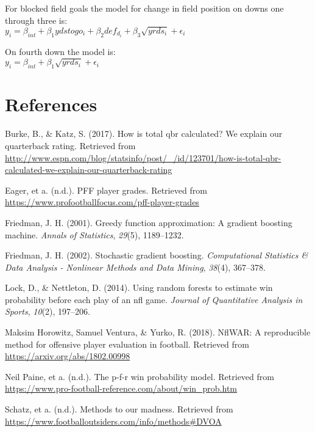 \documentclass[12pt,twoside]{dukestatscithesis}
\begin{document}
For blocked field goals the model for change in field position on downs one through three is:\\
\(y_{i} = \beta_{int} + \beta_{1}ydstogo_i + \beta_{2}def_{d_i} + \beta_{3}\sqrt{yrds_i} + \epsilon_{i}\)

On fourth down the model is:\\
\(y_{i} = \beta_{int} + \beta_{1}\sqrt{yrds_i} + \epsilon_{i}\)

\backmatter

\hypertarget{references}{%
\chapter*{References}\label{references}}


\noindent

\setlength{\parindent}{-0.20in}
\setlength{\leftskip}{0.20in}
\setlength{\parskip}{8pt}

\hypertarget{refs}{}
\leavevmode\hypertarget{ref-ESPN}{}%
Burke, B., \& Katz, S. (2017). How is total qbr calculated? We explain our quarterback rating. Retrieved from \url{http://www.espn.com/blog/statsinfo/post/_/id/123701/how-is-total-qbr-calculated-we-explain-our-quarterback-rating}

\leavevmode\hypertarget{ref-PFF}{}%
Eager, et a. (n.d.). PFF player grades. Retrieved from \url{https://www.profootballfocus.com/pff-player-grades}

\leavevmode\hypertarget{ref-friedman2001}{}%
Friedman, J. H. (2001). Greedy function approximation: A gradient boosting machine. \emph{Annals of Statistics}, \emph{29}(5), 1189--1232.

\leavevmode\hypertarget{ref-friedman2002}{}%
Friedman, J. H. (2002). Stochastic gradient boosting. \emph{Computational Statistics \& Data Analysis - Nonlinear Methods and Data Mining}, \emph{38}(4), 367--378.

\leavevmode\hypertarget{ref-lock2014}{}%
Lock, D., \& Nettleton, D. (2014). Using random forests to estimate win probability before each play of an nfl game. \emph{Journal of Quantitative Analysis in Sports}, \emph{10}(2), 197--206.

\leavevmode\hypertarget{ref-nflWAR}{}%
Maksim Horowitz, Samuel Ventura, \& Yurko, R. (2018). NflWAR: A reproducible method for offensive player evaluation in football. Retrieved from \url{https://arxiv.org/abs/1802.00998}

\leavevmode\hypertarget{ref-PFR}{}%
Neil Paine, et a. (n.d.). The p-f-r win probability model. Retrieved from \url{https://www.pro-football-reference.com/about/win_prob.htm}

\leavevmode\hypertarget{ref-FootballOutsiders}{}%
Schatz, et a. (n.d.). Methods to our madness. Retrieved from \url{https://www.footballoutsiders.com/info/methods\#DVOA}


\end{document}
